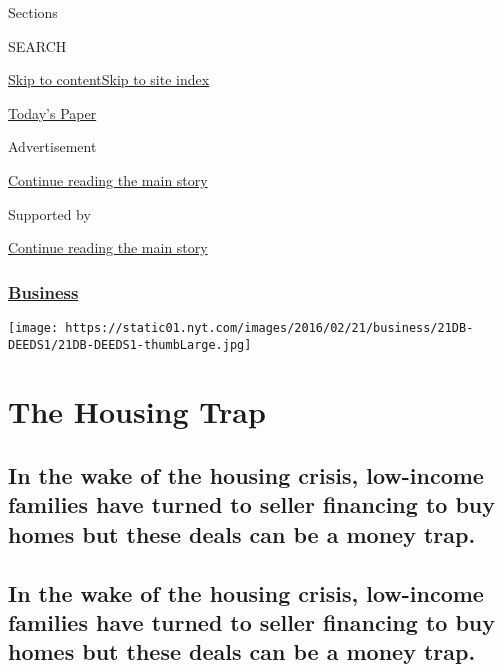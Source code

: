 Sections

SEARCH

\protect\hyperlink{site-content}{Skip to
content}\protect\hyperlink{site-index}{Skip to site index}

\href{https://myaccount.nytimes.com/auth/login?response_type=cookie\&client_id=vi}{}

\href{https://www.nytimes.com/section/todayspaper}{Today's Paper}

Advertisement

\protect\hyperlink{after-top}{Continue reading the main story}

Supported by

\protect\hyperlink{after-sponsor}{Continue reading the main story}

\hypertarget{business}{%
\subsubsection{\texorpdfstring{\href{/section/business}{Business}}{Business}}\label{business}}

\texttt{[image: https://static01.nyt.com/images/2016/02/21/business/21DB-DEEDS1/21DB-DEEDS1-thumbLarge.jpg]}

\hypertarget{the-housing-trap}{%
\section{The Housing Trap}\label{the-housing-trap}}

\hypertarget{in-the-wake-of-the-housing-crisis-low-income-families-have-turned-to-seller-financing-to-buy-homes-but-these-deals-can-be-a-money-trap}{%
\subsection{In the wake of the housing crisis, low-income families have
turned to seller financing to buy homes but these deals can be a money
trap.}\label{in-the-wake-of-the-housing-crisis-low-income-families-have-turned-to-seller-financing-to-buy-homes-but-these-deals-can-be-a-money-trap}}

\hypertarget{in-the-wake-of-the-housing-crisis-low-income-families-have-turned-to-seller-financing-to-buy-homes-but-these-deals-can-be-a-money-trap-1}{%
\subsection{In the wake of the housing crisis, low-income families have
turned to seller financing to buy homes but these deals can be a money
trap.}\label{in-the-wake-of-the-housing-crisis-low-income-families-have-turned-to-seller-financing-to-buy-homes-but-these-deals-can-be-a-money-trap-1}}

